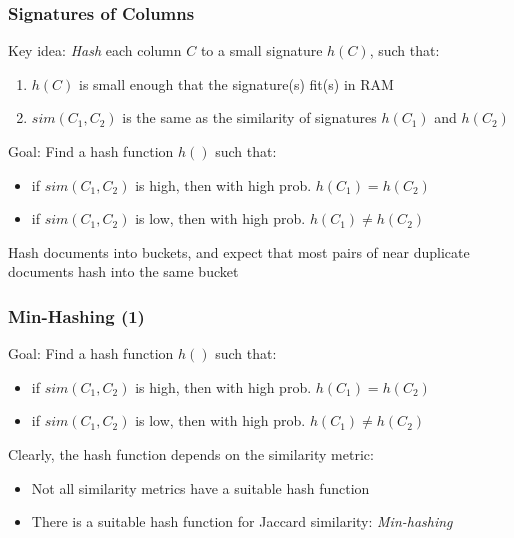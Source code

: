 \documentclass[svgnames]{beamer}
\begin{document}
\begin{frame} \frametitle{Signatures of Columns}

\begin{block}{Key idea:} 
\emph{Hash} each column $C$ to a small signature $h(C)$, such that:
\begin{enumerate}
  \item $h(C)$ is small enough that the signature(s) fit(s) in RAM
  \item $sim(C_1, C_2)$ is the same as the similarity of signatures $h(C_1)$ and $h(C_2)$
\end{enumerate}
\end{block}

\begin{block}{Goal:} 
Find a hash function $h()$ such that:
\begin{itemize}
\item if $sim(C_1,C_2)$ is high, then with high prob. $h(C_1) = h(C_2)$
\item if $sim(C_1,C_2)$ is low, then with high prob. $h(C_1) \neq h(C_2)$
\end{itemize}
\end{block}

Hash documents into buckets, and expect that most pairs of near duplicate documents hash into the same bucket
\end{frame}

  
\begin{frame} \frametitle{Min-Hashing (1)}

\begin{block}{Goal:} 
Find a hash function $h()$ such that:
\begin{itemize}
\item if $sim(C_1,C_2)$ is high, then with high prob. $h(C_1) = h(C_2)$
\item if $sim(C_1,C_2)$ is low, then with high prob. $h(C_1) \neq h(C_2)$
\end{itemize}
\end{block}

Clearly, the hash function depends on the similarity metric:

\begin{itemize}
  \item Not all similarity metrics have a suitable hash function
  \item There is a suitable hash function for Jaccard similarity: \emph{Min-hashing}
\end{itemize}  
\end{frame}
\end{document}

